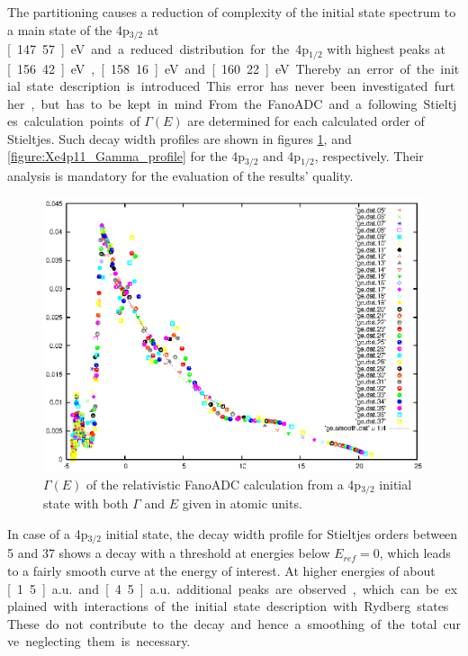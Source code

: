 The partitioning causes a reduction of complexity of the initial state
spectrum to a main state of the 4p$_{3/2}$ at \unit[147.57]{eV} and a
reduced distribution for
the 4p$_{1/2}$ with highest peaks at \unit[156.42]{eV}, \unit[158.16]{eV}
and \unit[160.22]{eV}.
Thereby an error of the initial state description is introduced.
This error has never been investigated further, but has to be kept in mind.

From the FanoADC and a following Stieltjes calculation points of $\Gamma(E)$ are
determined for each calculated order of Stieltjes. Such decay width profiles
are shown in figures \ref{figure:Xe4p33_Gamma_profile},
and \ref{figure:Xe4p11_Gamma_profile}
for the 4p$_{3/2}$ and 4p$_{1/2}$, respectively.
Their analysis is mandatory for the evaluation of the results' quality.

\begin{figure}[htb]
  \centering
  \includegraphics[scale=1.0]{pics/Xe4p_33_gammae.eps}
  \caption{$\Gamma(E)$ of the relativistic FanoADC calculation from a 4p$_{3/2}$
           initial state with both $\Gamma$ and $E$ given in atomic units.
           }
  \label{figure:Xe4p33_Gamma_profile}
\end{figure}

In case of a 4p$_{3/2}$ initial state, the decay width profile for Stieltjes
orders between 5 and 37 shows a decay
with a threshold at energies below $E_{ref}=0$, which leads to a fairly smooth
curve at the energy of interest.
At higher energies of about \unit[1.5]{a.u.} and
\unit[4.5]{a.u.} additional peaks are observed, which can be explained with
interactions of the initial state description with Rydberg states. These do not
contribute to the decay and hence a smoothing of the total curve neglecting them
is necessary.


